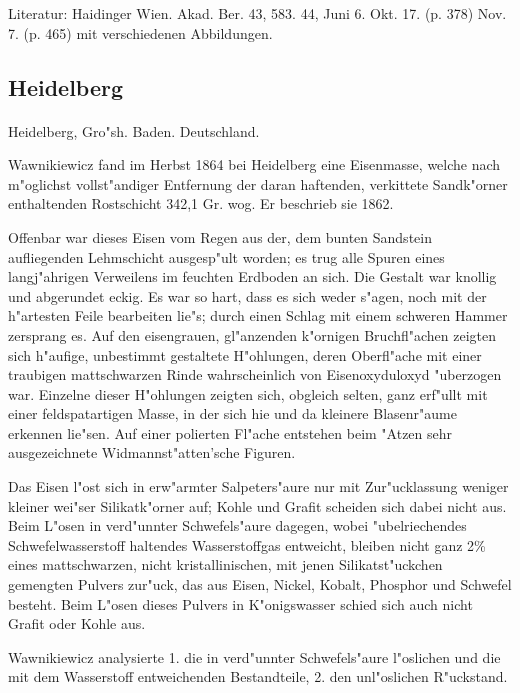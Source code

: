 \documentclass[a4paper, 11pt, oneside]{article}
\begin{document}
Literatur: Haidinger Wien. Akad. Ber. 43, 583. 44, Juni 6. Okt. 17. (p. 378) Nov. 7. (p. 465) mit verschiedenen Abbildungen.

\subsection{Heidelberg}
\normalsize
\paragraph{}
Heidelberg, Gro"sh. Baden. Deutschland.

Wawnikiewicz fand im Herbst 1864 bei Heidelberg eine Eisenmasse, welche nach m"oglichst vollst"andiger Entfernung der daran haftenden, verkittete Sandk"orner enthaltenden Rostschicht 342,1 Gr. wog. Er beschrieb sie 1862.

Offenbar war dieses Eisen vom Regen aus der, dem bunten Sandstein aufliegenden Lehmschicht ausgesp"ult worden; es trug alle Spuren eines langj"ahrigen Verweilens im feuchten Erdboden an sich. Die Gestalt war knollig und abgerundet eckig. Es war so hart, dass es sich weder s"agen, noch mit der h"artesten Feile bearbeiten lie"s; durch einen Schlag mit einem schweren Hammer zersprang es. Auf den eisengrauen, gl"anzenden k"ornigen Bruchfl"achen zeigten sich h"aufige, unbestimmt gestaltete H"ohlungen, deren Oberfl"ache mit einer traubigen mattschwarzen Rinde wahrscheinlich von Eisenoxyduloxyd "uberzogen war. Einzelne dieser H"ohlungen zeigten sich, obgleich selten, ganz erf"ullt mit einer feldspatartigen Masse, in der sich hie und da kleinere Blasenr"aume erkennen lie"sen. Auf einer polierten Fl"ache entstehen beim "Atzen sehr ausgezeichnete Widmannst"atten'sche Figuren.

Das Eisen l"ost sich in erw"armter Salpeters"aure nur mit Zur"ucklassung weniger kleiner wei"ser Silikatk"orner auf; Kohle und Grafit scheiden sich dabei nicht aus. Beim L"osen in verd"unnter Schwefels"aure dagegen, wobei "ubelriechendes Schwefelwasserstoff haltendes Wasserstoffgas entweicht, bleiben nicht ganz 2\% eines mattschwarzen, nicht kristallinischen, mit jenen Silikatst"uckchen gemengten Pulvers zur"uck, das aus Eisen, Nickel, Kobalt, Phosphor und Schwefel besteht. Beim L"osen dieses Pulvers in K"onigswasser schied sich auch nicht Grafit oder Kohle aus.

Wawnikiewicz analysierte 1. die in verd"unnter Schwefels"aure l"oslichen und die mit dem Wasserstoff entweichenden Bestandteile, 2. den unl"oslichen R"uckstand.
\end{document}
